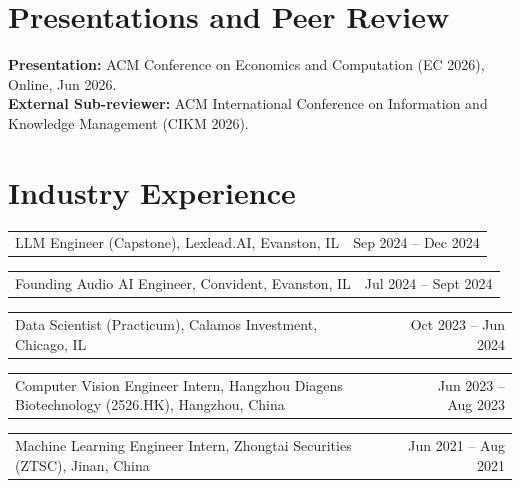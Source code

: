 \documentclass[10pt,letterpaper]{article}
\makeatletter
\newlength{\projectsep}\setlength{\projectsep}{2pt}
\newcommand{\industryentry}[4]{%
  \par\vspace{\projectsep}\noindent\begin{tabularx}{\textwidth}{@{}X r@{}}
    {\small #3, #1, #2} & {\small #4} \\
  \end{tabularx}\par\vspace{1pt}%
}
\makeatother
\begin{document}
\section{Presentations and Peer Review}
{\small \textbf{Presentation:} ACM Conference on Economics and Computation (EC 2026), Online, Jun 2026.\\
\textbf{External Sub-reviewer:} ACM International Conference on Information and Knowledge Management (CIKM 2026).}

\section{Industry Experience}

\industryentry
  {Lexlead.AI}
  {Evanston, IL}
  {LLM Engineer (Capstone)}
  {Sep 2024 -- Dec 2024}

\industryentry
  {Convident}
  {Evanston, IL}
  {Founding Audio AI Engineer}
  {Jul 2024 -- Sept 2024}

\industryentry
  {Calamos Investment}
  {Chicago, IL}
  {Data Scientist (Practicum)}
  {Oct 2023 -- Jun 2024}

\industryentry
  {Hangzhou Diagens Biotechnology (2526.HK)}
  {Hangzhou, China}
  {Computer Vision Engineer Intern}
  {Jun 2023 -- Aug 2023}

\industryentry
  {Zhongtai Securities (ZTSC)}
  {Jinan, China}
  {Machine Learning Engineer Intern}
  {Jun 2021 -- Aug 2021}
\end{document}
